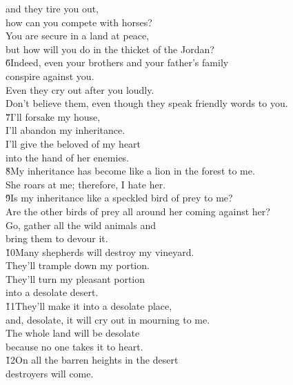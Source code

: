\begin{poetry}
\poemll    and they tire you out, \\
\poemlll       how can you compete with horses? \\
\poeml You are secure in a land at peace, \\
\poemll    but how will you do in the thicket of the Jordan? \\
\poeml \v{6}Indeed, even your brothers and your father's family \\
\poemll    conspire against you. \\
\poeml Even they cry out after you loudly. \\
\poemll    Don't believe them, even though they speak friendly words to you. \\
\poeml \v{7}I'll forsake my house, \\
\poemll    I'll abandon my inheritance. \\
\poeml I'll give the beloved of my heart \\
\poemll    into the hand of her enemies. \\
\poeml \v{8}My inheritance has become like a lion in the forest to me. \\
\poemll    She roars at me; therefore, I hate her. \\
\poeml \v{9}Is my inheritance like a speckled bird of prey to me? \\
\poemll    Are the other birds of prey all around her coming against her? \\
\poeml Go, gather all the wild animals and \\
\poemll    bring them to devour it. \\
\poeml \v{10}Many shepherds will destroy my vineyard. \\
\poemll    They'll trample down my portion. \\
\poeml They'll turn my pleasant portion \\
\poemll    into a desolate desert. \\
\poeml \v{11}They'll make it into a desolate place, \\
\poemll    and, desolate, it will cry out in mourning to me. \\
\poeml The whole land will be desolate \\
\poemll    because no one takes it to heart. \\
\poeml \v{12}On all the barren heights in the desert \\
\poemll    destroyers will come. \\

\end{poetry}
